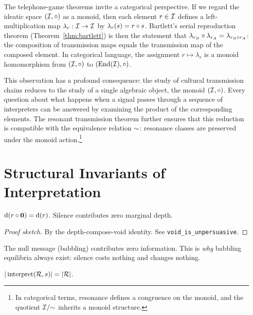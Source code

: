 The telephone-game theorems invite a categorical perspective.  If we
regard the ideatic space $(\mathcal{I}, \circ)$ as a monoid, then each
element $r \in \mathcal{I}$ defines a left-multiplication map
$\lambda_r : \mathcal{I} \to \mathcal{I}$ by $\lambda_r(s) = r \circ s$.
Bartlett's serial reproduction theorem
(Theorem~\ref{thm:bartlett}) is then the statement that
$\lambda_{r_B} \circ \lambda_{r_A} = \lambda_{r_B \circ r_A}$: the
composition of transmission maps equals the transmission map of the
composed element.  In categorical language, the assignment
$r \mapsto \lambda_r$ is a monoid homomorphism from $(\mathcal{I}, \circ)$
to $(\operatorname{End}(\mathcal{I}), \circ)$.

This observation has a profound consequence: the study of cultural
transmission chains reduces to the study of a single algebraic object,
the monoid $(\mathcal{I}, \circ)$.  Every question about what happens when a
signal passes through a sequence of interpreters can be answered by
examining the product of the corresponding elements.  The resonant
transmission theorem further ensures that this reduction is compatible
with the equivalence relation $\sim$: resonance classes are preserved
under the monoid action.\footnote{In categorical terms, resonance
defines a congruence on the monoid, and the quotient
$\mathcal{I} / {\sim}$ inherits a monoid structure.}

\section{Structural Invariants of Interpretation}
\label{sec:ch1:invariants}

\begin{theorem}
\label{thm:void-unpersuasive}
$\operatorname{d}(r \circ \mathbf{0}) = \operatorname{d}(r)$.  Silence contributes zero
marginal depth.
\end{theorem}

\begin{proof}[Proof sketch]
By the depth-compose-void identity.  See \texttt{void\_is\_unpersuasive}.
\end{proof}

\begin{remark}
The null message (babbling) contributes zero information.  This is
\emph{why} babbling equilibria always exist: silence costs nothing and
changes nothing.
\end{remark}

\begin{theorem}
\label{thm:conserves-count}
$|\operatorname{interpret}(\mathcal{R}, s)| = |\mathcal{R}|$.
\end{theorem}

